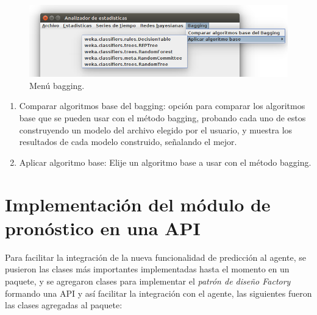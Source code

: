 \begin{figure}[ht]%
	\centering
	\includegraphics[width=14cm]{img/menuBagging.png}
	\caption{Menú bagging.}
	\label{fig:menuBagging}
\end{figure}

\renewcommand{\labelenumi}{$\bullet$ }
\begin{enumerate}
	\item Comparar algoritmos base del bagging: opción para comparar los algoritmos base que se pueden usar con el método bagging, probando cada uno de estos construyendo un modelo del archivo elegido por el usuario, y muestra los resultados de cada modelo construido, señalando el mejor.
	\item Aplicar algoritmo base: Elije un algoritmo base a usar con el método bagging.
\end{enumerate}


\section{Implementación del módulo de pronóstico en una API} \label{sec:implementacionAPI}

Para facilitar la integración de la nueva funcionalidad de predicción al agente, se pusieron las clases más importantes implementadas hasta el momento en un paquete, y se agregaron clases para implementar el  \textit{patrón de diseño Factory} formando una API y así facilitar la integración con el agente, las siguientes fueron las clases agregadas al paquete: 

